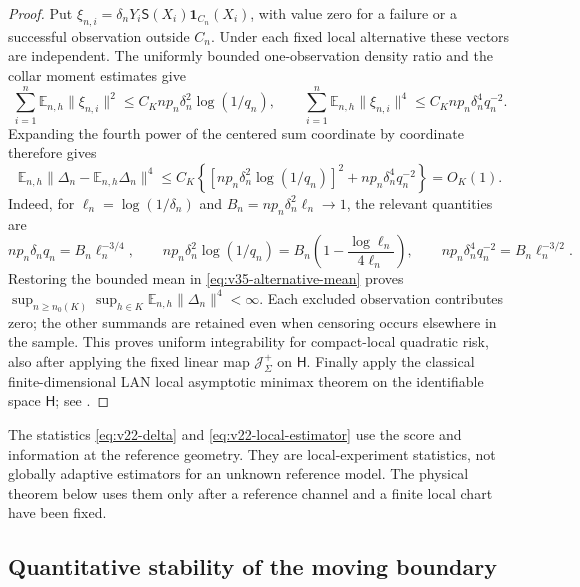 \begin{proof}
Put $\xi_{n,i}=\delta_nY_i\mathsf S(X_i)\mathbf1_{C_n}(X_i)$,
with value zero for a failure or a successful observation outside $C_n$.
Under each fixed local alternative these vectors are independent.
The uniformly bounded one-observation density ratio and the collar
moment estimates give
\[
 \sum_{i=1}^n\mathbb E_{n,h}\|\xi_{n,i}\|^2
       \le C_Knp_n\delta_n^2\log(1/q_n),\qquad
 \sum_{i=1}^n\mathbb E_{n,h}\|\xi_{n,i}\|^4
       \le C_Knp_n\delta_n^4q_n^{-2}.
\]
Expanding the fourth power of the centered sum coordinate by coordinate
therefore gives
\begin{equation}\label{eq:v35-centered-fourth}
 \mathbb E_{n,h}\|\Delta_n-\mathbb E_{n,h}\Delta_n\|^4
 \le C_K\!\left\{
       [np_n\delta_n^2\log(1/q_n)]^2
          +np_n\delta_n^4q_n^{-2}\right\}=O_K(1).
\end{equation}
Indeed, for $\ell_n=\log(1/\delta_n)$ and
$B_n=np_n\delta_n^2\ell_n\to1$, the relevant quantities are
\[
 np_n\delta_nq_n=B_n\ell_n^{-3/4},\qquad
 np_n\delta_n^2\log(1/q_n)
       =B_n\left(1-\frac{\log\ell_n}{4\ell_n}\right),\qquad
 np_n\delta_n^4q_n^{-2}=B_n\ell_n^{-3/2}.
\]
Restoring the bounded mean in \eqref{eq:v35-alternative-mean} proves
$\sup_{n\ge n_0(K)}\sup_{h\in K}\mathbb E_{n,h}\|\Delta_n\|^4<\infty$.
Each excluded observation contributes zero; the other summands are retained
even when censoring occurs elsewhere in the sample.  This proves uniform
integrability for compact-local quadratic risk, also after applying the
fixed linear map $\mathcal J_\Sigma^+$ on $\mathsf H$.
Finally apply the classical finite-dimensional LAN local asymptotic minimax
theorem on the identifiable space $\mathsf H$; see
\cite{IbragimovHasminskii,HiranoPorter}.
\end{proof}

\begin{remark}
The statistics \eqref{eq:v22-delta} and \eqref{eq:v22-local-estimator} use the
score and information at the reference geometry.  They are local-experiment
statistics, not globally adaptive estimators for an unknown reference model.
The physical theorem below uses them only after a reference channel and a
finite local chart have been fixed.
\end{remark}

\subsection{Quantitative stability of the moving boundary}

